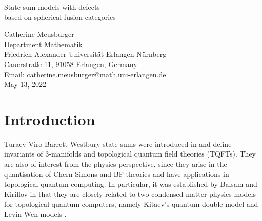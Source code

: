 \documentclass[1.5pt, a4paper]{article}
\def\mytitle{State sum models with defects\\ based on spherical fusion categories}
\begin{document}
\begin{center}


  {\huge \mytitle}

  \vspace{.5em}


  
   {\large
   Catherine Meusburger\\[+1ex]
 }
 Department Mathematik \\
  Friedrich-Alexander-Universit\"at Erlangen-N\"urnberg \\
  Cauerstra\ss e 11,  91058 Erlangen, Germany\\
  Email: catherine.meusburger@math.uni-erlangen.de\\[+4ex]
  
{May 13, 2022}



  \begin{abstract}
We define a Turaev-Viro-Barrett-Westbury state sum model of  triangulated 3-manifolds with surface, line and point defects. Surface defects are oriented embedded 2d PL submanifolds and are labeled with bimodule categories  over spherical fusion categories with bimodule traces. Line and point defects form directed graphs on these surfaces and labeled with bimodule functors and bimodule natural transformations. 
The state sum is based on generalised 6j symbols  that encode the coherence isomorphisms of the defect data. We prove the triangulation independence of the state sum and show that it can be computed in terms of polygon diagrams that satisfy the cutting and gluing identities for polygon presentations of oriented surfaces. By  computing  state sums  with defect surfaces, we show that they detect the genus of a defect surface and are sensitive to its embedding. We show that  defect lines on defect surfaces  with trivial defect data define ribbon invariants for the centre of the underlying spherical fusion category. 
  \end{abstract}
\end{center}


\section*{Introduction}




Turaev-Viro-Barrett-Westbury state sums were introduced in \cite{TV, BW} and  define invariants of 3-manifolds and topological quantum field theories (TQFTs).  They are also of interest from the physics perspective, since they arise in the quantisation of  Chern-Simons and BF theories and have applications in topological quantum computing.  In particular, it was established  by Balsam and Kirillov in  \cite{BK, Kr} that they are closely related to  two  condensed matter physics models for topological quantum computers, namely  Kitaev's quantum double model \cite{Kit} and Levin-Wen models \cite{LW}.
\end{document}
